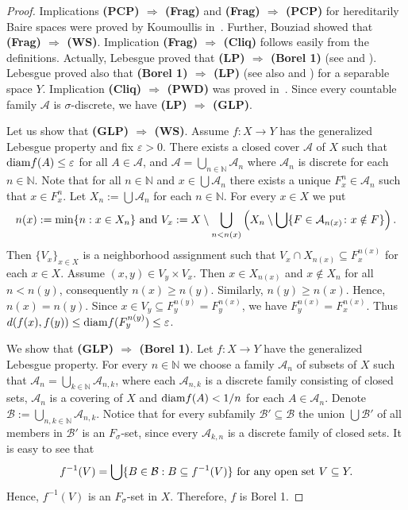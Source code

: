 \documentclass[a4paper]{amsart}
\theoremstyle{plain}
\theoremstyle{definition}
\theoremstyle{remark}
\numberwithin{equation}{section}
\begin{document}
	 
 \begin{proof}	
    Implications {\bf (PCP) $\Rightarrow$ (Frag)} and {\bf (Frag) $\Rightarrow$ (PCP)} for hereditarily Baire spaces
    were proved by Koumoullis in~\cite[Theorem 2.3]{Kou}. 
	Further, Bouziad \cite{Bou} showed that {\bf (Frag) $\Rightarrow$ (WS)}. 
	Implication   {\bf (Frag) $\Rightarrow$ (Cliq)} follows easily from the definitions.
	Actually, Lebesgue proved that  {\bf (LP) $\Rightarrow$ (Borel 1)} (see \cite[p. 375]{Ku} and \cite{BHH}). 
  	Lebesgue proved also that {\bf (Borel 1) $\Rightarrow$ (LP)} (see also \cite[p. 375]{Ku} and \cite[Theorem 2.1]{BHH}) for a separable space $Y$.    
 	Implication {\bf (Cliq) $\Rightarrow$ (PWD)} was proved in~\cite{MR686978}.
    Since every countable family $\mathcal A$ is $\sigma$-discrete, we have {\bf (LP) $\Rightarrow$ (GLP)}. 

 	Let us show that {\bf (GLP) $\Rightarrow$ (WS)}. Assume $f\colon X\to Y$ has the generalized Lebesgue property and fix $\varepsilon>0$. 
 	There exists a closed cover $\mathcal{A}$ of $X$ 
 	such that ${\rm diam}f(A)\le\varepsilon$ for all $A\in\mathcal{A}$, and $\mathcal{A}=\bigcup_{n\in\mathbb{N}}\mathcal{A}_n$ where $\mathcal{A}_n$ is discrete for each $n\in\mathbb{N}$. 	
 	Note that for all $n\in\mathbb{N}$ and  
    $x\in\bigcup\mathcal{A}_n$ there exists a unique $F^n_x\in\mathcal{A}_n$ such that $x\in F^n_x$.
 	Let $X_n:=\bigcup\mathcal{A}_n$ for each $n\in\mathbb{N}$. For every $x\in X$ we put
 	$$n(x):=\min\{n:x\in X_n\} \textup{\ and\ } V_x:=X\setminus \bigcup_{n<n(x)}\left(X_n\setminus\bigcup \{F\in \mathcal{A}_{n(x)}\colon x\notin F\}\right) .$$
 	Then $\{V_x\}_{x\in X}$ is a neighborhood assignment such that $V_x\cap X_{n(x)}\subseteq F^{n(x)}_x$ for each $x\in X$.
 	Assume $(x,y)\in V_y\times V_x$. Then $x\in X_{n(x)}$ and $x\not\in X_n$ for all $n<n(y)$, consequently $n(x)\ge n(y)$. 
 	Similarly, $n(y)\ge n(x)$. Hence, $n(x)=n(y)$.
 	Since $x\in V_y\subseteq F^{n(y)}_y=F^{n(x)}_y$, we have
 	$F^{n(x)}_y=F^{n(x)}_x$.
 	Thus $d(f(x),f(y))\le {\rm diam}f( F^{n(y)}_y )\le\varepsilon$. 
 	
 	We show that {\bf (GLP) $\Rightarrow$ (Borel 1)}. Let $f\colon X\to Y$ have the generalized Lebesgue property. 
 	For every $n\in\mathbb N$ we choose a  family $\mathcal A_n$ of subsets of $X$ such that 
 	$\mathcal A_n=\bigcup_{k\in\mathbb N}\mathcal A_{n,k}$, 
 	where each $\mathcal A_{n,k}$ is a discrete family consisting of closed sets, 
 	$\mathcal A_n$ is a covering of $X$
 	and ${\rm diam}f(A)<1/n$ for each $A\in \mathcal A_n$. 
 	Denote $\mathcal B:=\bigcup_{n,k\in\mathbb N}\mathcal A_{n,k}$. 
 	Notice that for every subfamily $\mathcal B'\subseteq \mathcal B$ the union $\bigcup\mathcal B'$ of all members in $\mathcal B'$ is an $F_\sigma$-set, 
 	since every $\mathcal A_{k,n}$ is a discrete family of closed sets. 
 	It is easy to see that 
 	$$f^{-1}(V)=\bigcup\{B\in\mathcal B: B\subseteq f^{-1}(V)\} \textup{\ for any open set\ }V\subseteq Y.$$
 	Hence, $f^{-1}(V)$ is an $F_\sigma$-set in $X$. Therefore, $f$ is Borel 1. 
    

\end{proof}
\end{document}
